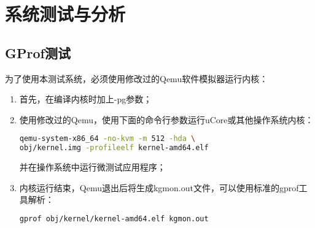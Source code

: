
\chapter{系统测试与分析}
\label{cha:test}

\section{GProf测试}
为了使用本测试系统，必须使用修改过的Qemu软件模拟器运行内核：
\begin{enumerate}
	\item 首先，在编译内核时加上-pg参数；
	\item
		使用修改过的Qemu，使用下面的命令行参数运行uCore或其他操作系统内核：
		\begin{lstlisting}[language=bash]
qemu-system-x86_64 -no-kvm -m 512 -hda \
obj/kernel.img -profileelf kernel-amd64.elf
		\end{lstlisting}

		并在操作系统中运行微测试应用程序；
	\item
		内核运行结束，Qemu退出后将生成kgmon.out文件，可以使用标准的gprof工具解析：
		\begin{lstlisting}[language=bash]
			gprof obj/kernel/kernel-amd64.elf kgmon.out 
		\end{lstlisting}

\end{enumerate}


